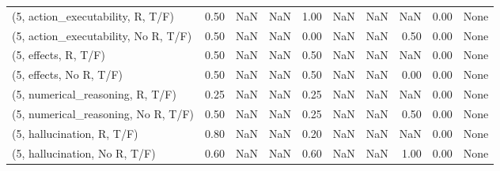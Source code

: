 \begin{table*}[h!]
\begin{adjustbox}{width=2\columnwidth,center}
\begin{tabular}{lrrr|rrr|rrr}
(5, action\_executability, R, T/F)    &                      0.50 &                   NaN &                       NaN &                          1.00 &                       NaN &                           NaN &                                    NaN &                               0.00 &                                  None \\
(5, action\_executability, No R, T/F) &                      0.50 &                   NaN &                       NaN &                          0.00 &                       NaN &                           NaN &                                   0.50 &                               0.00 &                                  None \\
(5, effects, R, T/F)                 &                      0.50 &                   NaN &                       NaN &                          0.50 &                       NaN &                           NaN &                                    NaN &                               0.00 &                                  None \\
(5, effects, No R, T/F)              &                      0.50 &                   NaN &                       NaN &                          0.50 &                       NaN &                           NaN &                                   0.00 &                               0.00 &                                  None \\
(5, numerical\_reasoning, R, T/F)     &                      0.25 &                   NaN &                       NaN &                          0.25 &                       NaN &                           NaN &                                    NaN &                               0.00 &                                  None \\
(5, numerical\_reasoning, No R, T/F)  &                      0.50 &                   NaN &                       NaN &                          0.25 &                       NaN &                           NaN &                                   0.50 &                               0.00 &                                  None \\
(5, hallucination, R, T/F)           &                      0.80 &                   NaN &                       NaN &                          0.20 &                       NaN &                           NaN &                                    NaN &                               0.00 &                                  None \\
(5, hallucination, No R, T/F)        &                      0.60 &                   NaN &                       NaN &                          0.60 &                       NaN &                           NaN &                                   1.00 &                               0.00 &                                  None \\

\end{tabular}
\end{adjustbox}
\end{table*}
